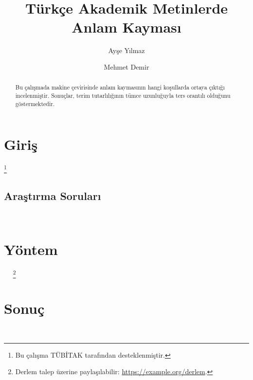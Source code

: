 \documentclass[11pt,a4paper]{article}
\title{Türkçe Akademik Metinlerde Anlam Kayması}
\author{Ayşe Yılmaz \and Mehmet Demir}
\date{}
\begin{document}
\maketitle
\begin{abstract}
Bu çalışmada makine çevirisinde anlam kaymasının hangi koşullarda ortaya çıktığı incelenmiştir. Sonuçlar, terim tutarlılığının tümce uzunluğuyla ters orantılı olduğunu göstermektedir.
\end{abstract}
\section{Giriş}
\paragrafA\footnote{Bu çalışma TÜBİTAK tarafından desteklenmiştir.} \paragrafB
\paragrafC
\subsection{Araştırma Soruları}
\paragrafB\ \paragrafA
\section{Yöntem}
\paragrafC\ \paragrafA\ \paragrafB
\paragrafA\footnote{Derlem talep üzerine paylaşılabilir: \url{https://example.org/derlem}.}
\section{Sonuç}
\paragrafB\ \paragrafC
\end{document}
